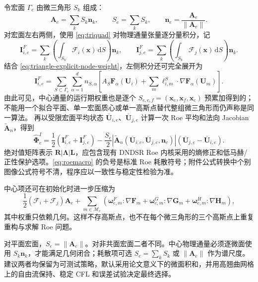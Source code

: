 \documentclass[UTF8,a4paper,11pt,openany]{ctexrep}
\numberwithin{equation}{chapter}
\newcommand{\dd}{\,\mathrm d}
\newcommand{\Flux}{\bm{\mathcal F}}
\newcommand{\grad}{\nabla}
\begin{document}
令宏面 $\Gamma_e$ 由微三角形 $S_k$ 组成：
\begin{equation}
  \bm A_e=\sum_k S_k\bm n_k,
  \qquad S_e=\sum_kS_k,
  \qquad \bm n_e=\frac{\bm A_e}{\|\bm A_e\|}.
  \label{eq:macrogeom}
\end{equation}
对宏面左右两侧，使用 \cref{eq:triquad} 对物理通量张量逐分量积分，记
\begin{equation}
  \bm I^F_{i,e}=\sum_k\left(\int_{S_k}\Flux_i(\bm x)\dd S\right)\bm n_k,
  \qquad
  \bm I^F_{j,e}=\sum_k\left(\int_{S_k}\Flux_j(\bm x)\dd S\right)\bm n_k.
\end{equation}
结合 \cref{eq:triangle-explicit-node-weight}，左侧积分还可完全展开为
\begin{equation}
  \boxed{
  \bm I^F_{i,e}
  =\sum_{S\subset\Gamma_e}\sum_{\alpha=1}^{d}n_{S,\alpha}
   \left[
      A_S\bm F_\alpha(\bm U_i)
      +\sum_m\bm\ell^S_{i,m}\cdot
        \grad\bm F_\alpha(\bm U_m)
   \right].}
  \label{eq:central-flux-from-dual-triangles}
\end{equation}
由此可见，中心通量的运行期权重也是逐个
$S_{e,c,f}=(\bm x_e,\bm x_f,\bm x_c)$ 预累加得到的；不能用一个拟合平面、单一宏面质心或单一高斯点替代整组微三角形而仍声称是同一算法。
再以受限宏面平均状态 $\overline{\bm U}_{i,e}$、$\overline{\bm U}_{j,e}$ 计算一次 Roe 平均和法向 Jacobian $\widetilde{\bm A}_n$，得到
\begin{equation}
  \boxed{
  \widehat{\bm\Phi}^{I}_e
  =\frac12\left(\bm I^F_{i,e}+\bm I^F_{j,e}\right)
  -\frac{S_e}{2}\left|\widetilde{\bm A}_n
       (\overline{\bm U}_{i,e},\overline{\bm U}_{j,e},\bm n_e)\right|
       \left(\overline{\bm U}_{j,e}-\overline{\bm U}_{i,e}\right).}
  \label{eq:roemacro}
\end{equation}
绝对值矩阵表示 $\bm R|\bm\Lambda|\bm L$，应包含现有 DNDSR Roe 内核采用的熵修正和低马赫/正性保护选项。\cref{eq:roemacro} 的负号是标准 Roe 耗散符号；附件公式转换中个别图像公式符号不清，程序应以一致性与稳定性检验为准。

中心项还可在初始化时进一步压缩为
\begin{equation}
 \frac12(\Flux_i+\Flux_j)\bm A_e
 +\sum_{m\in\mathcal M_e}\left(
   \bm\omega^{F}_{e,m}\!:\grad\bm F_m+
   \bm\omega^{G}_{e,m}\!:\grad\bm G_m+
   \bm\omega^{H}_{e,m}\!:\grad\bm H_m\right),
 \label{eq:fluxweights}
\end{equation}
其中权重只依赖几何。这样不存高斯点，也不在每个微三角形的三个高斯点上重复重构与求解 Roe 问题。

\begin{riskbox}[翘曲宏面的面积定义]
对平面宏面，$S_e=\|\bm A_e\|$。对非共面宏面二者不同。中心物理通量必须逐微面使用 $S_k\bm n_k$，才能满足几何闭合；耗散项可选 $S_e=\sum_kS_k$ 或 $\|\bm A_e\|$ 作为谱尺度。建议两者均保留为可测试策略，默认采用论文意义下的微面积和，并用高翘曲网格上的自由流保持、稳定 CFL 和误差试验决定最终选择。
\end{riskbox}
\end{document}
